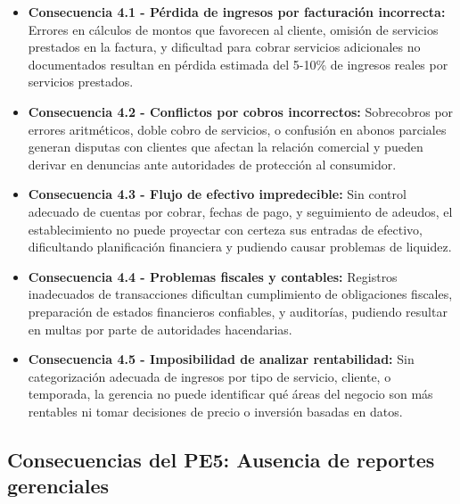 	\begin{itemize}
		\item \textbf{Consecuencia 4.1 - Pérdida de ingresos por facturación incorrecta:} Errores en cálculos de montos que favorecen al cliente, omisión de servicios prestados en la factura, y dificultad para cobrar servicios adicionales no documentados resultan en pérdida estimada del 5-10\% de ingresos reales por servicios prestados.
		
		\item \textbf{Consecuencia 4.2 - Conflictos por cobros incorrectos:} Sobrecobros por errores aritméticos, doble cobro de servicios, o confusión en abonos parciales generan disputas con clientes que afectan la relación comercial y pueden derivar en denuncias ante autoridades de protección al consumidor.
		
		\item \textbf{Consecuencia 4.3 - Flujo de efectivo impredecible:} Sin control adecuado de cuentas por cobrar, fechas de pago, y seguimiento de adeudos, el establecimiento no puede proyectar con certeza sus entradas de efectivo, dificultando planificación financiera y pudiendo causar problemas de liquidez.
		
		\item \textbf{Consecuencia 4.4 - Problemas fiscales y contables:} Registros inadecuados de transacciones dificultan cumplimiento de obligaciones fiscales, preparación de estados financieros confiables, y auditorías, pudiendo resultar en multas por parte de autoridades hacendarias.
		
		\item \textbf{Consecuencia 4.5 - Imposibilidad de analizar rentabilidad:} Sin categorización adecuada de ingresos por tipo de servicio, cliente, o temporada, la gerencia no puede identificar qué áreas del negocio son más rentables ni tomar decisiones de precio o inversión basadas en datos.
	\end{itemize}

\subsection{Consecuencias del PE5: Ausencia de reportes gerenciales}
\label{sec:consecuencias5}

